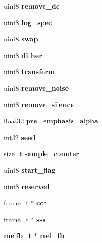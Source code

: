 \begin{DoxyCompactItemize}
\item 
uint8 {\bfseries remove\-\_\-dc}\label{structfe__s_ac575bed8a61105f4302bd27246d4c33d}

\item 
uint8 {\bfseries log\-\_\-spec}\label{structfe__s_a7d3d6513ae6b60632d14c1e1d5dfe891}

\item 
uint8 {\bfseries swap}\label{structfe__s_ab08200d2bfc6d868536d802501525179}

\item 
uint8 {\bfseries dither}\label{structfe__s_abd7b32a70dc6512134e39dd54d160689}

\item 
uint8 {\bfseries transform}\label{structfe__s_a49f2e495d938acaf5c918059e99854e2}

\item 
uint8 {\bfseries remove\-\_\-noise}\label{structfe__s_a254fc94d7868163fba6f2d8826d60fa6}

\item 
uint8 {\bfseries remove\-\_\-silence}\label{structfe__s_a8479b916c411d6d0140bf4a16eb83437}

\item 
float32 {\bfseries pre\-\_\-emphasis\-\_\-alpha}\label{structfe__s_aa7dc496e33955b7f06f83715c05ded8e}

\item 
int32 {\bfseries seed}\label{structfe__s_a0f42573b9f0ce0247181c5dd79e16b67}

\item 
size\-\_\-t {\bfseries sample\-\_\-counter}\label{structfe__s_a40c006f7494fdad56833d5fd7ccf6904}

\item 
uint8 {\bfseries start\-\_\-flag}\label{structfe__s_aa05ae3633c2b33e77a7b8b90e769176b}

\item 
uint8 {\bfseries reserved}\label{structfe__s_a18670c79bc0cd9848fdf4711c5094542}

\item 
frame\-\_\-t $\ast$ {\bfseries ccc}\label{structfe__s_afc472de43bd747de659dd57bc9a74fae}

\item 
frame\-\_\-t $\ast$ {\bfseries sss}\label{structfe__s_a6525c59397073d363e1844c28746fcb9}

\item 
{\bf melfb\-\_\-t} $\ast$ {\bfseries mel\-\_\-fb}\label{structfe__s_ae5a054dbac5e32cf028b6d6d4c9391bd}


\end{DoxyCompactItemize}
